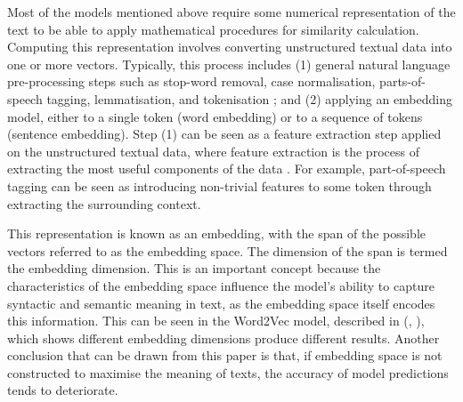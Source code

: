 \documentclass[10pt,oneside]{report}
\renewcommand{\citet}[1]{\citeauthor{#1}, \citeyear{#1}}
\begin{document}
Most of the models mentioned above require some numerical representation of the text to be able to apply mathematical procedures for similarity calculation. Computing this representation involves converting unstructured textual data into one or more vectors. Typically, this process includes (1) general natural language pre-processing steps such as stop-word removal, case normalisation, parts-of-speech tagging, lemmatisation, and tokenisation \cite{tabassum2020survey}; and (2) applying an embedding model, either to a single token (word embedding) or to a sequence of tokens (sentence embedding). Step (1) can be seen as a feature extraction step applied on the unstructured textual data, where feature extraction is the process of extracting the most useful components of the data \cite{sammons2016edison}. For example, part-of-speech tagging can be seen as introducing non-trivial features to some token through extracting the surrounding context. 

This representation is known as an embedding, with the span of the possible vectors referred to as the embedding space. The dimension of the span is termed the embedding dimension. This is an important concept because the characteristics of the embedding space influence the model's ability to capture syntactic and semantic meaning in text, as the embedding space itself encodes this information. This can be seen in the Word2Vec model, described in (\citet{bojanowski2017enriching}), which shows different embedding dimensions produce different results. Another conclusion that can be drawn from this paper is that, if embedding space is not constructed to maximise the meaning of texts, the accuracy of model predictions tends to deteriorate. 
\end{document}
